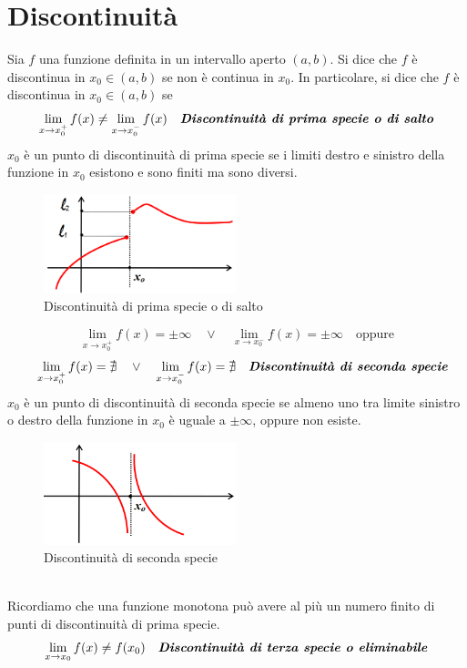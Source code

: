 \documentclass{article}
\begin{document}
\section*{Discontinuità}
Sia $f$ una funzione definita in un intervallo aperto $(a,b)$. Si dice che $f$
è discontinua in $x_0\in(a,b)$ se non è continua in $x_0$. In particolare, si
dice che $f$ è discontinua in $x_0\in(a,b)$ se
\[
    \lim_{x\to x_0^+}f(x) \neq \lim_{x\to x_0^-}f(x) \quad \textbf{\textit{Discontinuità di prima specie o di salto}}
\]
$x_0$ è un punto di discontinuità di prima specie se i limiti destro e sinistro della funzione in $x_0$ esistono e sono finiti ma sono diversi.
\begin{figure}[h]
    \centering
    \includegraphics[width=0.5\textwidth]{discsalto.png}
    \caption{Discontinuità di prima specie o di salto}
\end{figure}
\[
    \lim_{x\to x_0^+}f(x) = \pm\infty \quad \lor \quad \lim_{x\to x_0^-}f(x) = \pm\infty \quad \text{oppure}\]
\[
    \quad \lim_{x\to x_0^+}f(x) = \nexists \quad \lor \quad \lim_{x\to x_0^-}f(x) = \nexists \quad \textbf{\textit{Discontinuità di seconda specie}}
\]
$x_0$ è un punto di discontinuità di seconda specie se almeno uno tra limite sinistro o destro della funzione in $x_0$ è uguale a $\pm\infty$, oppure non esiste.
\begin{figure}[h]
    \centering
    \includegraphics[width=0.5\textwidth]{discsecond.png}
    \caption{Discontinuità di seconda specie}
\end{figure}
\\Ricordiamo che una funzione monotona può avere al più un numero finito di punti di discontinuità di prima specie.\\
\newpage
\[
    \lim_{x\to x_0}f(x) \neq f(x_0) \quad \textbf{\textit{Discontinuità di terza specie o eliminabile}}
\]
\end{document}
